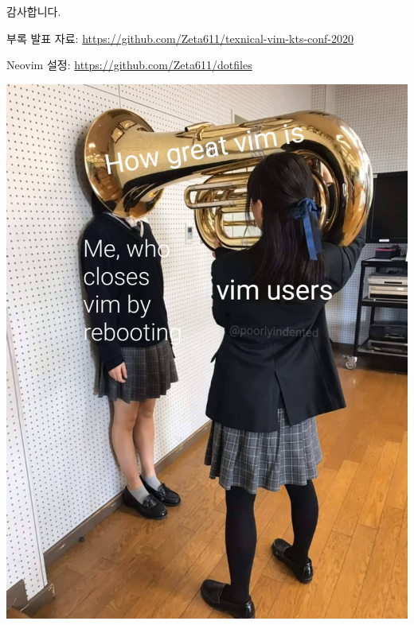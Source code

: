 \documentclass{beamer}
\begin{document}
\begin{frame}[standout]
  감사합니다.
\end{frame}

\begin{frame}{부록}
  발표 자료: \url{https://github.com/Zeta611/texnical-vim-kts-conf-2020}

  Neovim 설정: \url{https://github.com/Zeta611/dotfiles}

  \centering\includegraphics[width=0.35\linewidth]{figures/how-great-vim-is}
\end{frame}
\end{document}
